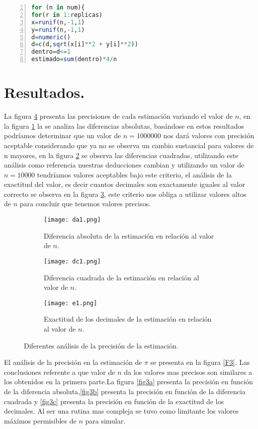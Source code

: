\documentclass{article}
\begin{document}
 \begin{lstlisting}[frame=single,numbers=left,language=R,caption=Estimación del valor de $\pi$. \label{R2}]
for (n in num){
for(r in 1:replicas)
x=runif(n,-1,1)
y=runif(n,-1,1)
d=numeric()
d=c(d,sqrt(x[i]**2 + y[i]**2))
dentro=d<=1
estimado=sum(dentro)*4/n
\end{lstlisting} 
\section{Resultados.}
La figura \ref{F2}  presenta las precisiones de cada estimación variando el valor de $n$, en la figura \ref{fig2a} la se analiza las diferencias absolutas, basándose en estos resultados podríamos determinar que un valor  de $n=1000000$ nos dará valores con precisión aceptable considerando que ya no se observa un cambio sustancial para valores de n mayores, en la figura \ref{fig2b} se observa las diferencias cuadradas, utilizando este análisis como referencia nuestras deducciones cambian y utilizando un valor de $n=10000$ tendríamos valores aceptables bajo este criterio, el análisis de la exactitud del valor, es decir cuantos decimales son exactamente iguales al valor correcto se observa en la figura \ref{fig2c}, este criterio nos obliga a utilizar valores altos de $n$ para concluir que tenemos valores precisos.

\begin{figure}
\centering
     \begin{subfigure}[b]{.45\linewidth}
         \texttt{[image: da1.png]}
         \caption{Diferencia absoluta de la estimación en relación al valor de $n$.}
         \label{fig2a}
     \end{subfigure}
     
     \begin{subfigure}[b]{.45\linewidth}
         \texttt{[image: dc1.png]}
         \caption{Diferencia cuadrada de la estimación en relación al valor de $n$.}
         \label{fig2b}
     \end{subfigure}
     \begin{subfigure}[b]{.45\linewidth}
     \centering
         \texttt{[image: e1.png]}
         \caption{Exactitud de los decimales de la estimación en relación al valor de $n$.}
         \label{fig2c}
     \end{subfigure}
     \caption{Diferentes análisis de la precisión de la estimación.}
        \label{F2}
\end{figure}
El análisis de la precisión en la estimación de $\pi$ se presenta en la figura \ref{F3}. Las conclusiones referente a que valor de $n$ da los valores mas precisos son similares a los obtenidos en la primera parte.La figura \ref{fig3a} presenta la precisión en función de la diferencia absoluta,\ref{fig3b} presenta la precisión en función de la diferencia cuadrada y \ref{fig3c} presenta la precisión en función de la exactitud de los decimales. Al ser una rutina mas compleja se tuvo como limitante los valores máximos permisibles de $n$ para simular.
\end{document}
